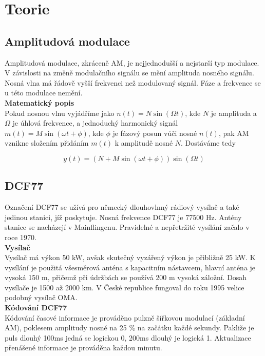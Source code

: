 \section{Teorie}
\subsection{Amplitudová modulace}
    Amplitudová modulace, zkráceně AM, je nejjednodušší a nejstarší typ modulace. V
    závislosti na změně modulačního signálu se mění amplituda nosného signálu.
    Nosná vlna má řádově vyšší frekvenci než modulovaný signál. Fáze a frekvence se u této
    modulace nemění.
\\

    \textbf{Matematický popis}
\\

    Pokud nosnou vlnu vyjádříme jako $n(t) = N \sin{(\Omega t)}$, kde $N$ je amplituda a
    $\Omega$ je úhlová frekvence, a jednoduchý harmonický signál $m(t) = M \sin{(\omega t
    + \phi)}$, kde $\phi$ je fázový posun vůči nosné $n(t)$, pak AM vznikne složením
    přidáním $m(t)$ k amplitudě nosné $N$. Dostáváme tedy

    \begin{equation}
        y(t) = (N+M \sin{(\omega t +\phi)})\sin{(\Omega t)}
    \end{equation}
\subsection{DCF77}
    Označení DCF77 se užívá pro německý dlouhovlnný rádiový vysílač a také jedinou
    stanici, jíž poskytuje. Nosná frekvence DCF77 je 77500 Hz. Antény stanice se nacházejí
    v Mainflingenu. Pravidelné a nepřetržité vysílání začalo v roce 1970.
\\

    \textbf{Vysílač}
\\

    Vysílač má výkon 50 kW, avšak skutečný vyzářený výkon je přibližně 25 kW. K vysílání
    je použitá všesměrová anténa s kapacitním nástavcem, hlavní anténa je vysoká 150 m,
    přičemž při údržbách se používá 200 m vysoká záložní. Dosah vysílače je 1500 až 2000
    km. V České republice fungoval do roku 1995 velice podobný vysílač OMA.
\\

    \textbf{Kódování DCF77}
\\

    Kódování časové informace je prováděno pulzně šířkovou modulací (základní AM), poklesem amplitudy
    nosné na 25 \% na začátku každé sekundy. Pakliže je puls dlouhý 100ms jedná se
    logickou 0, 200ms dlouhý je logická 1. Aktualizace přenášené informace je prováděna
    každou minutu.

